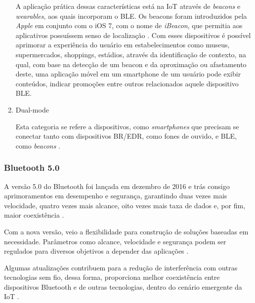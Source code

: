 \begin{enumerate}[label=(\Alph*)]
    A aplicação prática dessas características está na IoT através de \textit{beacons} e \textit{wearables}, aos quais incorporam o BLE. Os beacons foram introduzidos pela \textit{Apple} em conjunto com o iOS 7, com o nome de \textit{iBeacon}, que permitia aos aplicativos possuíssem senso de localização \cite{Apple2014}. Com esses dispositivos é possível aprimorar a experiência do usuário em estabelecimentos como museus, supermercados, shoppings, estádios, através da identificação de contexto, na qual, com base na detecção de um beacon e da aproximação ou afastamento deste, uma aplicação móvel em um smartphone de um usuário pode exibir conteúdos, indicar promoções entre outros relacionados aquele dispositivo BLE.
    
    \item{Dual-mode}
    
    Esta categoria se refere a dispositivos, como \textit{smartphones} que precisam se conectar tanto com dispositivos BR/EDR, como fones de ouvido, e BLE, como \textit{beacons} \cite{BluetoothSIG2017a}.

\end{enumerate}


\subsubsection{Bluetooth 5.0}

A versão 5.0 do Bluetooth foi lançada em dezembro de 2016 e trás consigo aprimoramentos em desempenho e segurança, garantindo duas vezes mais velocidade, quatro vezes mais alcance, oito vezes mais taxa de dados e, por fim, maior coexistência \cite{BluetoothSIG2017b}. 

Com a nova versão, veio a flexibilidade para construção de soluções baseadas em necessidade. Parâmetros como alcance, velocidade e segurança podem ser regulados para diversos objetivos a depender das aplicações \cite{BluetoothSIG2017b}.

Algumas atualizações contribuem para a redução de interferência com outras tecnologias sem fio, dessa forma, proporciona melhor coexistência entre dispositivos Bluetooth e de outras tecnologias, dentro do cenário emergente da IoT \cite{BluetoothSIG2017b}.



